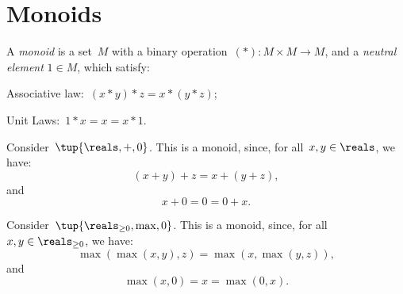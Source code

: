
\section{Monoids}


\begin{definition}[Monoid]
  A \emph{monoid} is a set~$M$ with a binary operation~$(*)\colon M\times M\to M$, and a \emph{neutral element} $1\in M$, which satisfy:
  \begin{compactenum}
    \item Associative law:~$(x* y)* z=x* (y* z)$;
    \item Unit Laws:~$1* x=x=x* 1$.
  \end{compactenum}
\end{definition}
\begin{example}
  Consider~$\tup{\reals,+,0}$. This is a monoid, since, for all~$x,y\in \reals$, we have:
  \begin{equation*}
    (x+y)+z=x+(y+z),
  \end{equation*}
  and
  \begin{equation*}
    x+0=0=0+x.
  \end{equation*}
\end{example}

\begin{example}
  Consider~$\tup{\reals_{\geq0},\max,0}$. This is a monoid, since, for all~$x,y\in \reals_{\geq0}$, we have:
  \begin{equation*}
    \max(\max(x,y),z)=\max(x,\max(y,z)),
  \end{equation*}
  and
  \begin{equation*}
    \max(x,0)=x=\max(0,x).
  \end{equation*}
\end{example}

